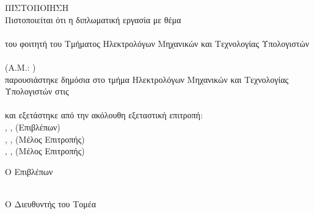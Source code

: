 \pagestyle{empty}
\begin{center}
{\LARGE ΠΙΣΤΟΠΟΙΗΣΗ\\[1cm]}
\large Πιστοποιείται ότι η διπλωματική εργασία με θέμα\\[1cm]
\textbf{\bf \large \doctitle }\\[1cm]
του φοιτητή του Τμήματος Ηλεκτρολόγων Μηχανικών και Τεχνολογίας Υπολογιστών\\[1cm]
\textbf{\metonoi}\\[0.5cm]
(Α.Μ.: \studnum)\\[1cm]
παρουσιάστηκε δημόσια στο τμήμα  Ηλεκτρολόγων Μηχανικών και Τεχνολογίας Υπολογιστών στις\\[1cm]
\Large{\imerominiaExetasis}\\[1cm]
\large και εξετάστηκε από την ακόλουθη εξεταστική επιτροπή:\\[1cm]
\supname, \suptitle, \depECE\space (Επιβλέπων)\\[0.2cm]
\epitropiEna, \epitropiEnaTitle, \depECE\space (Μέλος Επιτροπής)\\[0.2cm]
\epitropiDyo, \epitropiDyoTitle, \depECE\space (Μέλος Επιτροπής)\\[1cm]
\end{center}
\begin{minipage}{0.5\textwidth}
\begin{flushleft} \large
Ο Επιβλέπων\\[0.5cm]
\supname\\
\emph{\suptitle}
\end{flushleft}
\end{minipage}
\begin{minipage}{0.5\textwidth}
\begin{flushright} \large
Ο Διευθυντής του Τομέα\\[0.5cm]
\headofdivision\\
\emph{\headofdivisiontitle}
\end{flushright}
\end{minipage}